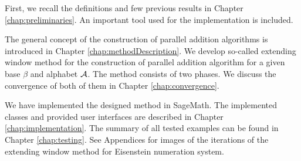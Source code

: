 First, we recall the definitions and few previous results in Chapter \ref{chap:preliminaries}. An important tool used for the implementation is included. 

The general concept of the construction of parallel addition algorithms is introduced in Chapter \ref{chap:methodDescription}. We develop so-called extending window method for the construction of parallel addition algorithm for a given base $\beta$ and alphabet $\mathcal{A}$. The method consists of two phases. We discuss the convergence of both of them in Chapter \ref{chap:convergence}.

We have implemented the designed method in SageMath. The implemented classes and provided user interfaces are described in Chapter \ref{chap:implementation}. The summary of all tested examples can be found in Chapter \ref{chap:testing}. See Appendices for images of the iterations of the extending window method for Eisenstein numeration system.














